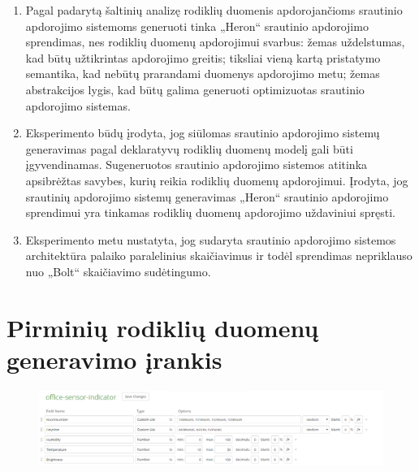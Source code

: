 \documentclass{VUMIFPSbakalaurinis}
\begin{document}
\begin{enumerate}
    \item Pagal padarytą šaltinių analizę rodiklių duomenis apdorojančioms srautinio apdorojimo sistemoms generuoti tinka „Heron“ srautinio apdorojimo sprendimas, nes rodiklių duomenų apdorojimui svarbus: žemas uždelstumas, kad būtų užtikrintas apdorojimo greitis; tiksliai vieną kartą pristatymo semantika, kad nebūtų prarandami duomenys apdorojimo metu; žemas abstrakcijos lygis, kad būtų galima generuoti optimizuotas srautinio apdorojimo sistemas.
    \item Eksperimento būdų įrodyta, jog siūlomas srautinio apdorojimo sistemų generavimas pagal deklaratyvų rodiklių duomenų modelį gali būti įgyvendinamas. Sugeneruotos srautinio apdorojimo sistemos atitinka apsibrėžtas savybes, kurių reikia rodiklių duomenų apdorojimui. Įrodyta, jog srautinių apdorojimo sistemų generavimas „Heron“ srautinio apdorojimo sprendimui yra tinkamas rodiklių duomenų apdorojimo uždaviniui spręsti.  
    \item Eksperimento metu nustatyta, jog sudaryta srautinio apdorojimo sistemos architektūra palaiko paralelinius skaičiavimus ir todėl sprendimas nepriklauso nuo „Bolt“ skaičiavimo sudėtingumo.
\end{enumerate}

\printbibliography[heading=bibintoc] 

\appendix 

\section{Pirminių rodiklių duomenų generavimo įrankis}\label{add:mockaroo}
\begin{figure}[H]
    \centering
    \includegraphics[width=1\textwidth]{img/generated-data.png}
    \label{img:generated-data}
\end{figure}
\end{document}
